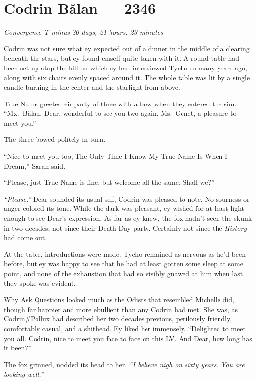 \hypertarget{codrin-bux103lan-2346}{%
\chapter{Codrin Bălan — 2346}}

\begin{center}
\emph{Convergence T-minus 20 days, 21 hours, 23 minutes}
\end{center}

\noindent Codrin was not sure what ey expected out of a dinner in the middle of a clearing beneath the stars, but ey found emself quite taken with it. A round table had been set up atop the hill on which ey had interviewed Tycho so many years ago, along with six chairs evenly spaced around it. The whole table was lit by a single candle burning in the center and the starlight from above.

True Name greeted eir party of three with a bow when they entered the sim. ``Mx.~Bălan, Dear, wonderful to see you two again. Ms.~Genet, a pleasure to meet you.''

The three bowed politely in turn.

``Nice to meet you too, The Only Time I Know My True Name Is When I Dream,'' Sarah said.

``Please, just True Name is fine, but welcome all the same. Shall we?''

\emph{``Please.''} Dear sounded its usual self, Codrin was pleased to note. No sourness or anger colored its tone. While the dark was pleasant, ey wished for at least light enough to see Dear's expression. As far as ey knew, the fox hadn't seen the skunk in two decades, not since their Death Day party. Certainly not since the \emph{History} had come out.

At the table, introductions were made. Tycho remained as nervous as he'd been before, but ey was happy to see that he had at least gotten some sleep at some point, and none of the exhaustion that had so visibly gnawed at him when last they spoke was evident.

Why Ask Questions looked much as the Odists that resembled Michelle did, though far happier and more ebullient than any Codrin had met. She was, as Codrin\#Pollux had described her two decades previous, perilously friendly, comfortably casual, and a shithead. Ey liked her immensely. ``Delighted to meet you all. Codrin, nice to meet you face to face on this LV. And Dear, how long has it been?''

The fox grinned, nodded its head to her. \emph{``I believe nigh on sixty years. You are looking well.''}


